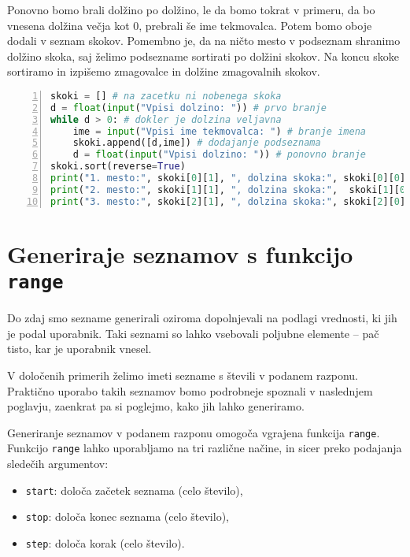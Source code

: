 \begin{resitev}
Ponovno bomo brali dolžino po dolžino, le da bomo tokrat v primeru, da bo vnesena dolžina večja kot 0, prebrali še ime tekmovalca. Potem bomo oboje dodali v seznam skokov. Pomembno je, da na ničto mesto v podseznam shranimo dolžino skoka, saj želimo podsezname sortirati po dolžini skokov. Na koncu skoke sortiramo in izpišemo zmagovalce in dolžine zmagovalnih skokov.
\begin{lstlisting}[language=Python,numbers=left]
skoki = [] # na zacetku ni nobenega skoka
d = float(input("Vpisi dolzino: ")) # prvo branje
while d > 0: # dokler je dolzina veljavna
    ime = input("Vpisi ime tekmovalca: ") # branje imena
    skoki.append([d,ime]) # dodajanje podseznama
    d = float(input("Vpisi dolzino: ")) # ponovno branje
skoki.sort(reverse=True)
print("1. mesto:", skoki[0][1], ", dolzina skoka:", skoki[0][0])
print("2. mesto:", skoki[1][1], ", dolzina skoka:",  skoki[1][0])
print("3. mesto:", skoki[2][1], ", dolzina skoka:", skoki[2][0])
\end{lstlisting}
\end{resitev}

\section{Generiraje seznamov s funkcijo \texttt{range}}

Do zdaj smo sezname generirali oziroma dopolnjevali na podlagi vrednosti, ki jih je podal uporabnik. Taki seznami so lahko vsebovali poljubne elemente -- pač tisto, kar je uporabnik vnesel.

V določenih primerih želimo imeti sezname s števili v podanem razponu. Praktično uporabo takih seznamov bomo podrobneje spoznali v naslednjem poglavju, zaenkrat pa si poglejmo, kako jih lahko generiramo.

Generiranje seznamov v podanem razponu omogoča vgrajena funkcija \texttt{range}. Funkcijo \texttt{range} lahko uporabljamo na tri različne načine, in sicer preko podajanja sledečih argumentov:
\begin{itemize}
\item \texttt{start}: določa začetek seznama (celo število),
\item \texttt{stop}: določa konec seznama (celo število),
\item \texttt{step}: določa korak (celo število).
\end{itemize}

